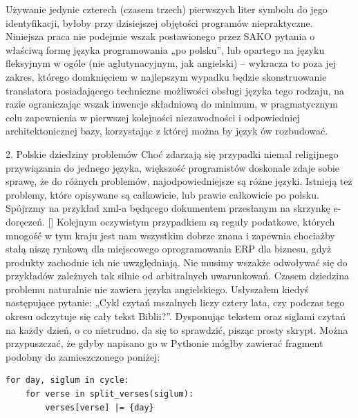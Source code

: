 Używanie jedynie czterech (czasem trzech) pierwszych liter symbolu do jego identyfikacji, byłoby przy dzisiejszej objętości programów niepraktyczne. Niniejsza praca nie podejmie wszak postawionego przez SAKO pytania o właściwą formę języka programowania „po polsku”, lub opartego na języku fleksyjnym w ogóle (nie aglutynacyjnym, jak angielski) – wykracza to poza jej zakres, którego domknięciem w najlepszym wypadku będzie skonstruowanie translatora posiadającego techniczne możliwości obsługi języka tego rodzaju, na razie ograniczając wszak inwencje składniową do minimum, w pragmatycznym celu zapewnienia w pierwszej kolejności niezawodności i odpowiedniej architektonicznej bazy, korzystając z której można by język ów rozbudować.

2. Polskie dziedziny problemów
Choć zdarzają się przypadki niemal religijnego przywiązania do jednego języka, większość programistów doskonale zdaje sobie sprawę, że do różnych problemów, najodpowiedniejsze są różne języki. Istnieją też problemy, które opisywane są całkowicie, lub prawie całkowicie po polsku. Spójrzmy na przykład xml-a będącego dokumentem przesłanym na skrzynkę e-doręczeń. 
[]
Kolejnym oczywistym przypadkiem są reguły podatkowe, których mnogość w tym kraju jest nam wszystkim dobrze znana i zapewnia chociażby stałą niszę rynkową dla miejscowego oprogramowania ERP dla biznesu, gdyż produkty zachodnie ich nie uwzględniają. Nie musimy wszakże odwoływać się do przykładów zależnych tak silnie od arbitralnych uwarunkowań. Czasem dziedzina problemu naturalnie nie zawiera języka angielskiego.
Usłyszałem kiedyś następujące pytanie: „Cykl czytań mszalnych liczy cztery lata, czy podczas tego okresu odczytuje się cały tekst Biblii?”. Dysponując tekstem oraz siglami czytań na każdy dzień, o co nietrudno, da się to sprawdzić, pisząc prosty skrypt. Można przypuszczać, że gdyby napisano go w Pythonie mógłby zawierać fragment podobny do zamieszczonego poniżej:
\begin{lstlisting}
for day, siglum in cycle:
	for verse in split_verses(siglum):
		verses[verse] |= {day}    
\end{lstlisting}

